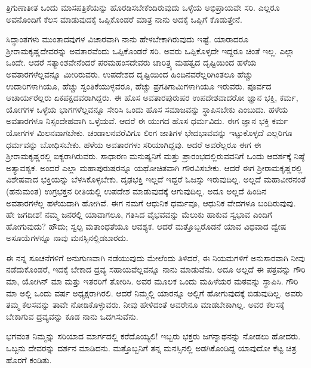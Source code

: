 \vspace{0.2cm}

ತ್ರಿಗುಣಾತೀತ ಒಂದು ಮಾಸಪತ್ರಿಕೆಯನ್ನು ಹೊರಡಿಸಬೇಕೆಂದಿರುವುದು ಒಳ್ಳೆಯ ಅಭಿಪ್ರಾಯವೇ ಸರಿ. ಎಲ್ಲರೂ ಅವನೊಂದಿಗೆ ಕೆಲಸ ಮಾಡುವುದಕ್ಕೆ ಒಪ್ಪಿಕೊಂಡರೆ ಮಾತ್ರ ನಾನು ಅದಕ್ಕೆ ಒಪ್ಪಿಗೆ ಕೊಡುತ್ತೇನೆ.

\vspace{0.2cm}

ಸಿದ್ಧಾಂತಗಳು ಮುಂತಾದವುಗಳ ವಿಚಾರವಾಗಿ ನಾನು ಹೇಳಬೇಕಾಗಿರುವುದು ಇಷ್ಟೆ. ಯಾರಾದರೂ ಶ‍್ರೀರಾಮಕೃಷ್ಣದೇವರನ್ನು ಅವತಾರವೆಂದು ಒಪ್ಪಿಕೊಂಡರೆ ಸರಿ. ಅವರು ಒಪ್ಪಿಕೊಳ್ಳದೇ ಇದ್ದರೂ ಚಿಂತೆ ಇಲ್ಲ. ಎಲ್ಲಾ ಒಂದೇ. ಆದರೆ ಸತ್ಯಾಂಶವೇನೆಂದರೆ ಪರಮಹಂಸದೇವರು ಚಾರಿತ್ರ್ಯ ಮಹತ್ವದ ದೃಷ್ಟಿಯಿಂದ ಹಳೆಯ ಅವತಾರಗಳೆಲ್ಲವನ್ನೂ ಮೀರಿರುವರು. ಉಪದೇಶದ ದೃಷ್ಟಿಯಿಂದ ಹಿಂದಿನವರೆಲ್ಲರಿಗಿಂತಲೂ ಹೆಚ್ಚು ಉದಾರಿಗಳಾಗಿಯೂ, ಹೆಚ್ಚು ಸ್ವಂತಿಕೆಯುಳ್ಳವರೂ, ಹೆಚ್ಚು ಪ್ರಗತಿಗಾಮಿಗಳಾಗಿಯೂ ಇರುವರು. ಪೂರ್ವದ ಆಚಾರ್ಯರೆಲ್ಲರು ಏಕಪಕ್ಷದವರಾಗಿದ್ದರು. ಈ ಹೊಸ ಅವತಾರಪುರುಷರ ಉಪದೇಶವಾದರೋ ಜ್ಞಾನ ಭಕ್ತಿ, ಕರ್ಮ, ಯೋಗಗಳ ಒಳ್ಳೆಯ ಭಾಗಗಳೆಲ್ಲವನ್ನೂ ಸೇರಿಸಿ ಒಂದು ಹೊಸ ಸಮಾಜವನ್ನು ಸ್ಥಾಪಿಸಬೇಕು ಎಂಬುದು. ಹಳೆಯ ಅವತಾರಗಳೂ ನಿಸ್ಸಂದೇಹವಾಗಿ ಒಳ್ಳೆಯವೆ. ಆದರೆ ಈ ಯುಗದ ಹೊಸ ಧರ್ಮವಿದು. ಈಗ ಜ್ಞಾನ ಭಕ್ತಿ ಕರ್ಮ ಯೋಗಗಳ ಮಿಲನವಾಗಬೇಕು. ಚಂಡಾಲನವರೆವಿಗೂ ಲಿಂಗ ಜಾತಿಗಳ ಭೇದಭಾವವನ್ನು ಇಟ್ಟುಕೊಳ್ಳದೆ ಎಲ್ಲರಿಗೂ ಧರ್ಮವನ್ನು ಬೋಧಿಸಬೇಕು. ಹಳೆಯ ಅವತಾರಗಳು ಸರಿಯಾಗಿದ್ದವು. ಆದರೆ ಅವರೆಲ್ಲರೂ ಈಗ ಈ ಶ‍್ರೀರಾಮಕೃಷ್ಣರಲ್ಲಿ ಐಕ್ಯರಾಗಿರುವರು. ಸಾಧಾರಣ ಮನುಷ್ಯನಿಗೆ ಮತ್ತು ಪ್ರಾರಂಭದಲ್ಲಿರುವವನಿಗೆ ಒಂದು ಆದರ್ಶಕ್ಕೆ ನಿಷ್ಠೆ ಅತ್ಯಾವಶ್ಯಕ. ಅಂದರೆ ಎಲ್ಲಾ ಮಹಾಪುರುಷರನ್ನೂ ಯಥೋಚಿತವಾಗಿ ಗೌರವಿಸಬೇಕು. ಆದರೆ ಈಗ ಶ‍್ರೀರಾಮಕೃಷ್ಣರಲ್ಲಿ ವಿಶೇಷವಾದ ಭಕ್ತಿಯನ್ನು ಬೆಳಸಿಕೊಳ್ಳಬೇಕು. ದೃಢಭಕ್ತಿ ಇಲ್ಲದೆ ಇದ್ದರೆ ಓಜಸ್ಸು ಇರುವುದಿಲ್ಲ. ಅಲ್ಲದೆ ಮಹಾವೀರನಂತೆ (ಹನುಮಂತ) ಉಗ್ರಭಕ್ತನ ರೀತಿಯಲ್ಲಿ ಉಪದೇಶ ಮಾಡುವುದಕ್ಕೆ ಆಗುವುದಿಲ್ಲ. ಅದೂ ಅಲ್ಲದೆ ಹಿಂದಿನ ಅವತಾರಗಳೆಲ್ಲ ಹಳೆಯದಾಗಿ ಹೋಗಿವೆ. ಈಗ ನಮಗೆ ಆಧುನಿಕ ಧರ್ಮವೂ, ಆಧುನಿಕ ವೇದಗಳೂ ಬಂದಿರುವುವು. ಹೇ ಜಗದೀಶ! ನಮ್ಮ ಜನರಲ್ಲಿ ಯಾವಾಗಲೂ, ಗತಿಸಿದ ವೈಭವವನ್ನು ಮೆಲುಕು ಹಾಕುವ ಸ್ವಭಾವ ಎಂದಿಗೆ ಹೋಗುವುದು? ಹೌದು; ಸ್ವಲ್ಪ ಮತಾಂಧತೆಯೂ ಆವಶ್ಯಕ. ಆದರೆ ಮತ್ತೊಬ್ಬರೊಡನೆ ಯಾವ ವಿಧವಾದ ದ್ವೇಷ ಅಸೂಯೆಗಳನ್ನೂ ನಾವು ಮನಸ್ಸಿನಲ್ಲಿಡಬಾರದು.

\vspace{0.2cm}

ಈ ನನ್ನ ಸೂಚನೆಗಳಿಗೆ ಅನುಗುಣವಾಗಿ ನಡೆಯುವುದು ಮೇಲೆಂದು ತಿಳಿದರೆ, ಈ ನಿಯಮಗಳಿಗೆ ಅನುಸಾರವಾಗಿ ನೀವು ನಡೆದುಕೊಂಡರೆ, ಇದಕ್ಕೆ ಬೇಕಾದ ದ್ರವ್ಯ ಸಹಾಯವೆಲ್ಲವನ್ನೂ ನಾನು ಮಾಡುವೆನು. ಅದೂ ಅಲ್ಲದೆ ಈ ಪತ್ರವನ್ನು ಗೌರಿ ಮಾ, ಯೋಗಿನ್ ಮಾ ಮತ್ತು ಇತರರಿಗೆ ತೋರಿಸಿ. ಅವರ ಮೂಲಕ ಒಂದು ಮಹಿಳೆಯರ ಮಠವನ್ನು ಸ್ಥಾಪಿಸಿ. ಗೌರಿ ಮಾ ಅಲ್ಲಿ ಒಂದು ವರ್ಷ ಅಧ್ಯಕ್ಷರಾಗಿರಲಿ. ಆದರೆ ನಿಮ್ಮಲ್ಲಿ ಯಾರನ್ನೂ ಅಲ್ಲಿಗೆ ಹೋಗುವುದಕ್ಕೆ ಬಿಡುವುದಿಲ್ಲ. ಅವರು ತಮ್ಮ ಕೆಲಸವನ್ನು ತಾವೇ ನೋಡಿಕೊಳ್ಳುವರು. ನೀವು ಹೇಳಿದಂತೆ ಅವರೇನೂ ಮಾಡಬೇಕಾಗಿಲ್ಲ. ಅವರ ಕೆಲಸಕ್ಕೆ ಬೇಕಾಗುವ ದ್ರವ್ಯವನ್ನು ಕೂಡ ನಾನು ಒದಗಿಸುವೆನು.

\vspace{0.2cm}

ಭಗವಂತ ನಿಮ್ಮನ್ನು ಸರಿಯಾದ ಮಾರ್ಗದಲ್ಲಿ ಕರೆದೊಯ್ಯಲಿ! ಇಬ್ಬರು ಭಕ್ತರು ಜಗನ್ನಾಥನನ್ನು ನೋಡಲು ಹೋದರು. ಒಬ್ಬನು ದೇವರನ್ನು ದರ್ಶನ ಮಾಡಿದನು. ಮತ್ತೊಬ್ಬನಿಗೆ ತನ್ನ ಮನಸ್ಸಿನಲ್ಲಿ ಅಡಗಿಕೊಂಡಿದ್ದ ಯಾವುದೋ ಕೆಟ್ಟ ಚಿತ್ರ ಹೊರಗೆ ಕಂಡಿತು.

